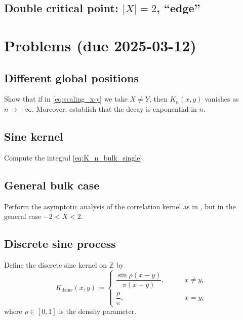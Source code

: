 \documentclass[letterpaper,11pt,oneside,reqno]{article}
\numberwithin{equation}{section}
\theoremstyle{definition}
\begin{document}
\subsection{Double critical point: $|X|=2$, ``edge''}
\label{sub:double-critical-points}





\appendix
\setcounter{section}{5}

\section{Problems (due 2025-03-12)}

\subsection{Different global positions}
\label{prob:different-global-positions}

Show that if in \eqref{eq:scaling_x-y} we take $X\ne Y$, then
$K_n(x,y)$ vanishes as $n\to+\infty$. Moreover,
establish that the decay is exponential in $n$.

\subsection{Sine kernel}
\label{prob:sine-kernel}

Compute the integral
\eqref{eq:K_n_bulk_single}.

\subsection{General bulk case}
\label{prob:imaginary-critical-points}

Perform the asymptotic analysis of the correlation
kernel as in ,
but in the general case $-2<X<2$.

\subsection{Discrete sine process}
\label{prob:discrete-sine-process}

Define the discrete sine kernel on $\mathbb{Z}$ by
\begin{equation*}
	K_{\mathrm{dsine}}(x,y)\coloneqq
	\begin{cases}
		\dfrac{\sin \rho(x-y)}{\pi (x-y)},&\qquad x\ne y,\\[10pt]
		\dfrac{\rho}{\pi},&\qquad x=y,
	\end{cases}
\end{equation*}
where $\rho\in[0,1]$ is the density parameter.
\end{document}
